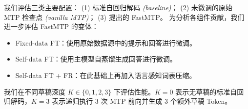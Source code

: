 \documentclass{article} %
\begin{document}
我们评估三类主要配置：
(1) 标准自回归解码 \textit{(baseline)}；
(2) 未微调的原始 MTP 检查点 \textit{(vanilla MTP)}；
(3) 提出的 FastMTP。
为分析各组件贡献，我们进一步评估 FastMTP 的变体：
\begin{itemize}
    \item Fixed-data FT：使用原始数据源中的提示和回答进行微调。

    \item Self-data FT：使用主模型自蒸馏生成回答进行微调。

    \item Self-data FT + FR：在此基础上再加入语言感知词表压缩。
\end{itemize}
我们在不同草稿深度 $K \in \{0, 1, 2, 3\}$ 下评估性能。$K=0$ 表示无草稿的标准自回归解码，$K=3$ 表示递归执行 3 次 MTP 前向并生成 3 个额外草稿 Token。

\end{document}
